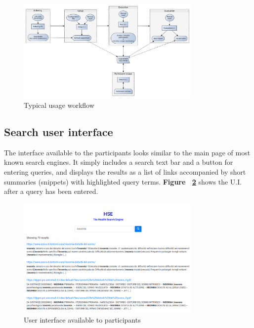 \documentclass[]{usiinfbachelorproject}
\begin{document}
\vspace{1cm}

\begin{figure} [h]
\centering
\includegraphics[width=0.8\textwidth]{img/yed/usage}
\caption{Typical usage workflow}
\label{fig:usage}
\end{figure}


\newpage

\subsection{Search user interface}

The interface available to the participants looks similar to the main page of most known search engines. It simply
includes a search text bar and a button for entering queries, and displays the results as a list of
links accompanied by short summaries (snippets) with highlighted query terms. 
\textbf{Figure ~\ref{fig:searchUi}} shows the U.I. after a query has been entered.

\begin{figure} [h]
\centering
\includegraphics[width=0.8\textwidth]{img/searchUi}
\caption{User interface available to participants}
\label{fig:searchUi}
\end{figure}
\end{document}

